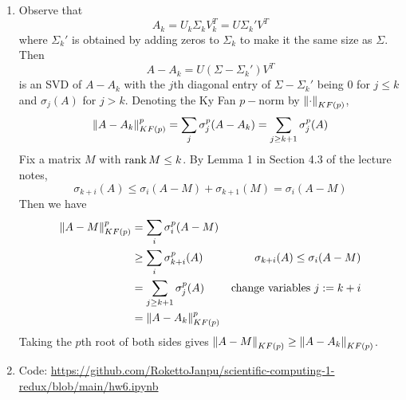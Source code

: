\documentclass{article}
\renewcommand{\S}{\Sigma}
\newcommand{\s}{\sigma}
\begin{document}
\begin{enumerate}
	\pagebreak
	
	
	
	\item Observe that
	\[A_k = U_k\S_kV_k^T = U\S_k'V^T\]
	where $\S_k'$ is obtained by adding zeros to $\S_k$ to make it the same size as $\S$. Then
	\[A - A_k = U(\S-\S_k')V^T\]
	is an SVD of $A-A_k$ with the $j$th diagonal entry of $\S-\S_k'$ being 0 for $j\le k$ and $\s_j(A)$ for $j>k$. Denoting the Ky Fan $p-$norm by $\norm{\cdot}_{KF(p)}$,
	\[\norm{A-A_k}_{KF(p)}^p = \sum_j \s_j^p(A-A_k) = \sum_{j\ge k+1} \s_j^p(A)\]
	Fix a matrix $M$ with $\rank M\le k$. By Lemma 1 in Section 4.3 of the lecture notes,
	\[\s_{k+i}(A) \le \s_i(A-M) + \s_{k+1}(M) = \s_i(A-M)\]
	Then we have
	\begin{align*}
		\norm{A-M}_{KF(p)}^p &= \sum_i \s_i^p(A-M) \\
		&\ge \sum_i \s_{k+i}^p(A) & \s_{k+i}(A) \le \s_i(A-M) \\
		&= \sum_{j\ge k+1} \s_j^p(A) & \text{change variables } j := k+i \\
		&= \norm{A-A_k}_{KF(p)}^p
	\end{align*}
	Taking the $p$th root of both sides gives $\norm{A-M}_{KF(p)} \ge \norm{A-A_k}_{KF(p)}$.



	\pagebreak
	
	
	
	\item Code: \url{https://github.com/RokettoJanpu/scientific-computing-1-redux/blob/main/hw6.ipynb}
	
	\begin{enumerate}
		
		
		

\end{enumerate}
\end{enumerate}
\end{document}
